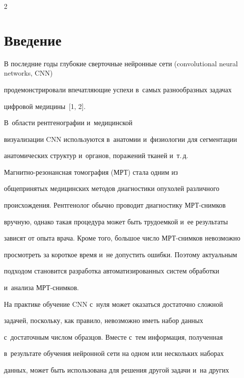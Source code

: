 \begin{multicols}{2}



\label{st\stat}

  

\section{Введение }



  В последние годы глубокие сверточные нейронные сети (convolutional neural networks, CNN) 

продемонстрировали впе\-чат\-ля\-ющие успехи в~самых разнообразных задачах 

циф\-ро\-вой медицины~[1, 2].\linebreak

 В~об\-ласти рентгенографии и~медицинской 

визуализации CNN используются в~анатомии и~физио\-ло\-гии для сегментации 

анатомических структур и~органов, поражений тканей и~т.\,д.  

Маг\-нит\-но-ре\-зо\-нанс\-ная томография (МРТ) стала одним из 

общепринятых медицинских методов диагностики опухолей различного 

про\-ис\-хож\-де\-ния. Рентгенолог обычно проводит диагностику МРТ-сним\-ков 

вручную, однако такая процедура может быть трудоемкой и~ее результаты 

зависят от опыта врача. Кроме того, большое чис\-ло МРТ-сним\-ков невозможно 

про\-смот\-реть за короткое время и~не допустить ошибки. Поэтому актуальным 

подходом становится разработка автоматизированных сис\-тем обработки 

и~анализа МРТ-сним\-ков. 

  

  На практике обучение CNN с~нуля может оказаться достаточно сложной 

задачей, поскольку, как правило, невозможно иметь набор данных 

с~достаточным числом образцов. Вместе с~тем информация, полученная 

в~результате обучения нейронной сети на одном или нескольких наборах 

данных, может быть использована для решения другой задачи и~на других 


\end{multicols}
